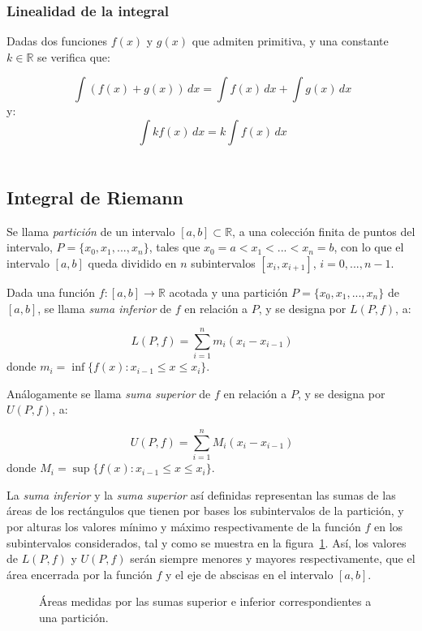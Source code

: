 \subsubsection*{Linealidad de la integral}

Dadas dos funciones $f(x)$ y $g(x)$ que admiten primitiva, y una
constante $k \in \mathbb{R}$ se verifica que:

\[
\ \int{(f(x)+g(x))}\,dx=\int{f(x)}\,dx+\int{g(x)}\,dx
\]
y:
\[
\ \int{kf(x)}\,dx=k\int{f(x)}\,dx
\]\\


\subsection{Integral de Riemann}

Se llama \emph{partición} de un intervalo $[a,b]\subset\mathbb{R}$,
a una colección finita de puntos del intervalo,
$P=\{x_{0},x_{1},...,x_{n}\}$,  tales que
$x_{0}=a<x_{1}<...<x_{n}=b$, con lo que el intervalo $[a,b]$ queda
dividido en $n$ subintervalos $[x_{i},x_{i+1}]$, $i=0,...,n-1$.

Dada una función $f:[a,b]\rightarrow\mathbb{R}$ acotada y una
partición $P=\{x_{0},x_{1},...,x_{n}\}$ de $[a,b]$, se llama
\emph{suma inferior} de $f$ en relación a $P$, y se designa por
$L(P,f)$, a:

\[
\ L(P,f)=\sum_{i=1}^{n} m_{i}(x_{i}-x_{i-1})
\]
donde $  m_{i}=\inf\{f(x):x_{i-1}\leq x \leq x_{i}\}$.

Análogamente se llama \emph{suma superior} de $f$ en relación a $P$,
y se designa por $U(P,f)$, a:

\[
\ U(P,f)=\sum_{i=1}^{n} M_{i}(x_{i}-x_{i-1})
\]
donde $ M_{i}=\sup\{f(x):x_{i-1}\leq x \leq x_{i}\}$.

La \emph{suma inferior} y la \emph{suma superior} así definidas
representan las sumas de las áreas de los rectángulos que tienen por
bases los subintervalos de la partición, y por alturas los valores
mínimo y máximo respectivamente de la función $f$ en los
subintervalos considerados, tal y como se muestra en la
figura~\ref{g:sumassupinf}. Así, los valores de $L(P,f)$ y $U(P,f)$
serán siempre menores y mayores respectivamente, que el área
encerrada por la función $f$ y el eje de abscisas en el intervalo
$[a,b]$.

\begin{figure}[htbp]
\centering {}\qquad\qquad
{}
\caption{Áreas medidas por las sumas superior e inferior
correspondientes a una partición.} \label{g:sumassupinf}
\end{figure}

